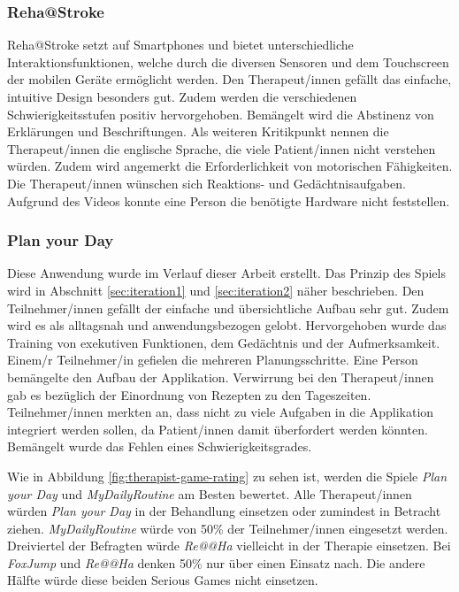 \subsubsection{Reha@Stroke}
Reha@Stroke setzt auf Smartphones und bietet unterschiedliche Interaktionsfunktionen, welche durch die diversen Sensoren und dem Touchscreen der mobilen Geräte ermöglicht werden. Den Therapeut/innen gefällt das einfache, intuitive Design besonders gut. Zudem werden die verschiedenen Schwierigkeitsstufen positiv hervorgehoben. Bemängelt wird die Abstinenz von Erklärungen und Beschriftungen. Als weiteren Kritikpunkt nennen die Therapeut/innen die englische Sprache, die viele Patient/innen nicht verstehen würden. Zudem wird angemerkt die Erforderlichkeit von motorischen Fähigkeiten. Die Therapeut/innen wünschen sich Reaktions- und Gedächtnisaufgaben. Aufgrund des Videos konnte eine Person die benötigte Hardware nicht feststellen.

\subsubsection{Plan your Day}
Diese Anwendung wurde im Verlauf dieser Arbeit erstellt. Das Prinzip des Spiels wird in Abschnitt \ref{sec:iteration1} und \ref{sec:iteration2} näher beschrieben. Den Teilnehmer/innen gefällt der einfache und übersichtliche Aufbau sehr gut. Zudem wird es als alltagsnah und anwendungsbezogen gelobt. Hervorgehoben wurde das Training von exekutiven Funktionen, dem Gedächtnis und der Aufmerksamkeit. Einem/r Teilnehmer/in gefielen die mehreren Planungsschritte. Eine Person bemängelte den Aufbau der Applikation. Verwirrung bei den Therapeut/innen gab es bezüglich der Einordnung von Rezepten zu den Tageszeiten. Teilnehmer/innen merkten an, dass nicht zu viele Aufgaben in die Applikation integriert werden sollen, da Patient/innen damit überfordert werden könnten. Bemängelt wurde das Fehlen eines Schwierigkeitsgrades.

Wie in Abbildung \ref{fig:therapist-game-rating} zu sehen ist, werden die Spiele \textit{Plan your Day} und \textit{MyDailyRoutine} am Besten bewertet. Alle Therapeut/innen würden \textit{Plan your Day} in der Behandlung einsetzen oder zumindest in Betracht ziehen. \textit{MyDailyRoutine} würde von 50\% der Teilnehmer/innen eingesetzt werden. Dreiviertel der Befragten würde \textit{Re@@Ha} vielleicht in der Therapie einsetzen. Bei \textit{FoxJump} und \textit{Re@@Ha} denken 50\% nur über einen Einsatz nach. Die andere Hälfte würde diese beiden Serious Games nicht einsetzen.

